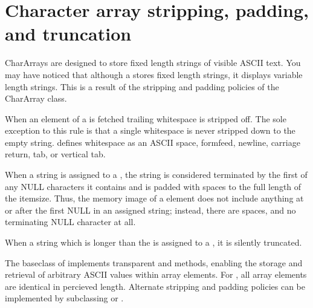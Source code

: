 \section{Character array stripping, padding, and truncation}
\label{sec:chararray-clip-pad-truncate}
CharArrays are designed to store fixed length strings of visible ASCII text.
You may have noticed that although a  stores fixed length
strings, it displays variable length strings.  This is a result of the
stripping and padding policies of the CharArray class.  

When an element of a  is fetched trailing whitespace is
stripped off.  The sole exception to this rule is that a single whitespace is
never stripped down to the empty string.   defines
whitespace as an ASCII space, formfeed, newline, carriage return, tab, or
vertical tab.

When a string is assigned to a , the string is considered
terminated by the first of any NULL characters it contains and is padded with
spaces to the full length of the  itemsize.  Thus, the memory
image of a  element does not include anything at or after the
first NULL in an assigned string; instead, there are spaces, and no terminating
NULL character at all.

When a string which is longer than the  is assigned to a
, it is silently truncated.

The  baseclass of  implements transparent
 and  methods, enabling the storage and retrieval of
arbitrary ASCII values within array elements.  For , all
array elements are identical in percieved length.  Alternate
stripping and padding policies can be implemented by subclassing
 or .

